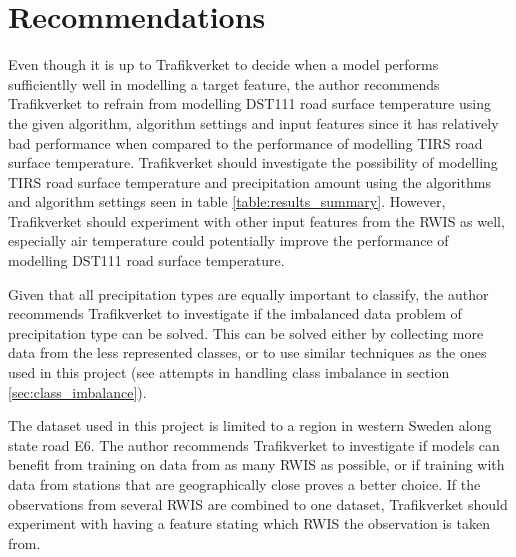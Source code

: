 \section{Recommendations}
		Even though it is up to Trafikverket to decide when a model performs sufficientlly well in modelling a target feature, the author recommends Trafikverket to refrain from modelling DST111 road surface temperature using the given algorithm, algorithm settings and input features since it has relatively bad performance when compared to the performance of modelling TIRS road surface temperature. Trafikverket should investigate the possibility of modelling TIRS road surface temperature and precipitation amount using the algorithms and algorithm settings seen in table \ref{table:results_summary}. However, Trafikverket should experiment with other input features from the RWIS as well, especially air temperature could potentially improve the performance of modelling DST111 road surface temperature. 

Given that all precipitation types are equally important to classify, the author recommends Trafikverket to investigate if the imbalanced data problem of precipitation type can be solved. This can be solved either by collecting more data from the less represented classes, or to use similar techniques as the ones used in this project (see attempts in handling class imbalance in section \ref{sec:class_imbalance}). 

	The dataset used in this project is limited to a region in western Sweden along state road E6. The author recommends Trafikverket to investigate if models can benefit from training on data from as many RWIS as possible, or if training with data from stations that are geographically close proves a better choice. If the observations from several RWIS are combined to one dataset, Trafikverket should experiment with having a feature stating which RWIS the observation is taken from.